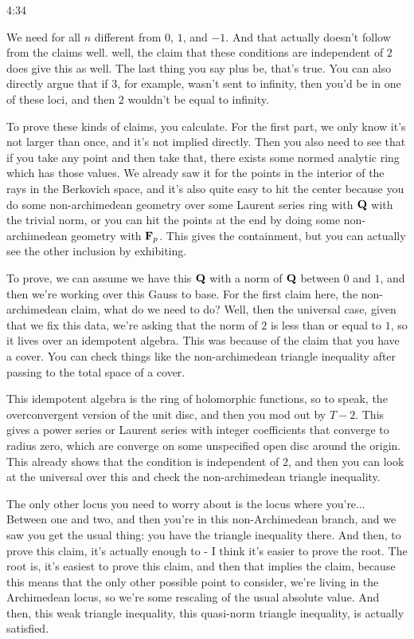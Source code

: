 \begin{unfinished}{4:34}
\begin{example}
We need for all $n$ different from $0$, $1$, and $-1$. And that actually doesn't follow from the claims well. well, the claim that these conditions are independent of $2$ does give this as well. The last thing you say plus be, that's true. You can also directly argue that if $3$, for example, wasn't sent to infinity, then you'd be in one of these loci, and then $2$ wouldn't be equal to infinity.

To prove these kinds of claims, you calculate. For the first part, we only know it's not larger than once, and it's not implied directly. Then you also need to see that if you take any point and then take that, there exists some normed analytic ring which has those values. We already saw it for the points in the interior of the rays in the Berkovich space, and it's also quite easy to hit the center because you do some non-archimedean geometry over some Laurent series ring with $\mathbf Q$ with the trivial norm, or you can hit the points at the end by doing some non-archimedean geometry with $\mathbf F_p$. This gives the containment, but you can actually see the other inclusion by exhibiting.

To prove, we can assume we have this $\mathbf Q$ with a norm of $\mathbf Q$ between $0$ and $1$, and then we're working over this Gauss to base. For the first claim here, the non-archimedean claim, what do we need to do? Well, then the universal case, given that we fix this data, we're asking that the norm of $2$ is less than or equal to $1$, so it lives over an idempotent algebra. This was because of the claim that you have a cover. You can check things like the non-archimedean triangle inequality after passing to the total space of a cover.

This idempotent algebra is the ring of holomorphic functions, so to speak, the overconvergent version of the unit disc, and then you mod out by $T - 2$. This gives a power series or Laurent series with integer coefficients that converge to radius zero, which are converge on some unspecified open disc around the origin. This already shows that the condition is independent of $2$, and then you can look at the universal over this and check the non-archimedean triangle inequality.

The only other locus you need to worry about is the locus where you're...
Between one and two, and then you're in this non-Archimedean branch, and we saw you get the usual thing: you have the triangle inequality there. And then, to prove this claim, it's actually enough to - I think it's easier to prove the root. The root is, it's easiest to prove this claim, and then that implies the claim, because this means that the only other possible point to consider, we're living in the Archimedean locus, so we're some rescaling of the usual absolute value. And then, this weak triangle inequality, this quasi-norm triangle inequality, is actually satisfied.


\end{example}
\end{unfinished}
